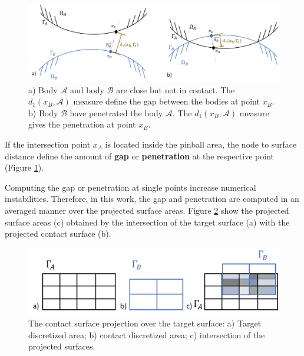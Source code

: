  \begin{center}
\begin{figure}
\centerline{\includegraphics[width=1\textwidth,keepaspectratio]{figures/gap_penetration.jpg} }
\caption{  a) Body $\mathcal{A}$ and body $\mathcal{B}$  are close but not in contact. The  $d_1(x_B,\mathcal{A})$ measure define the gap between the bodies at point $x_B$.  b) Body $\mathcal{B}$ have penetrated the body $\mathcal{A}$. The $d_1(x_B,\mathcal{A})$ measure gives the penetration at point $x_B$.}
\label{gap_penetration}
\end{figure}
\end{center}

If the intersection point $x_A$ is located inside the pinball area, the node to surface distance define the amount of \textbf{gap} or \textbf{penetration} at the respective point (Figure \ref{gap_penetration}).
 
Computing the gap or penetration at single points increase numerical instabilities.  Therefore, in this work, the gap and penetration are computed in an averaged manner over the projected surface areas. Figure \ref{projecte_surface} show the projected surface areas (c) obtained by the intersection of the target surface (a) with the projected contact surface (b). 

 \begin{center}
\begin{figure}
\centerline{\includegraphics[width=1\textwidth,keepaspectratio]{figures/projecte_surface.jpg} }
\caption{The contact surface projection over the target surface: a) Target discretized area; b) contact discretized area; c) intersection of the projected surfaces.}
\label{projecte_surface}
\end{figure}
\end{center}

